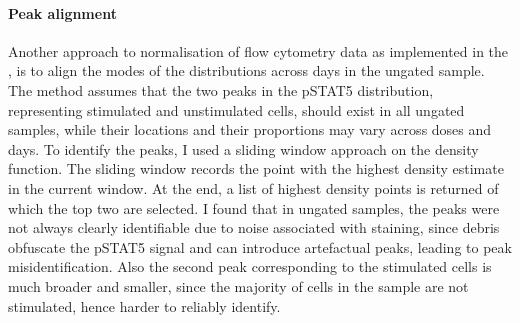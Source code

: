 
\paragraph{Peak alignment}
Another approach to normalisation of flow cytometry data as implemented in the , is to align the modes of the distributions across days in the ungated sample.
The method assumes that the two peaks in the pSTAT5 distribution, representing stimulated and unstimulated cells, should exist in all ungated samples, while their locations and their proportions may vary across doses and days.
To identify the peaks, I used a sliding window approach on the density function.
The sliding window records the point with the highest density estimate in the current window.
At the end, a list of highest density points is returned of which the top two are selected.  
I found that in ungated samples, the peaks were not always clearly identifiable due to noise associated with staining, since debris obfuscate the pSTAT5 signal and can introduce artefactual peaks, leading to peak misidentification.
Also the second peak corresponding to the stimulated cells is much broader and smaller, since the majority of cells in the sample are not stimulated, hence harder to reliably identify.
